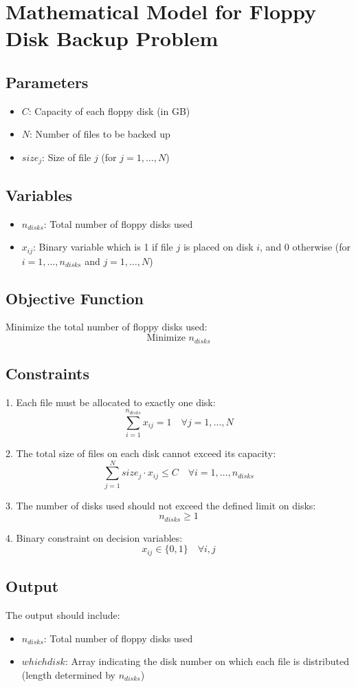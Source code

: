 \documentclass{article}
\begin{document}
\section*{Mathematical Model for Floppy Disk Backup Problem}

\subsection*{Parameters}
\begin{itemize}
    \item $C$: Capacity of each floppy disk (in GB)
    \item $N$: Number of files to be backed up
    \item $size_j$: Size of file $j$ (for $j = 1, \ldots, N$)
\end{itemize}

\subsection*{Variables}
\begin{itemize}
    \item $n_{disks}$: Total number of floppy disks used
    \item $x_{ij}$: Binary variable which is 1 if file $j$ is placed on disk $i$, and 0 otherwise (for $i = 1, \ldots, n_{disks}$ and $j = 1, \ldots, N$)
\end{itemize}

\subsection*{Objective Function}
Minimize the total number of floppy disks used:
\[
\text{Minimize } n_{disks}
\]

\subsection*{Constraints}
1. Each file must be allocated to exactly one disk:
\[
\sum_{i=1}^{n_{disks}} x_{ij} = 1 \quad \forall j = 1, \ldots, N
\]

2. The total size of files on each disk cannot exceed its capacity:
\[
\sum_{j=1}^{N} size_j \cdot x_{ij} \leq C \quad \forall i = 1, \ldots, n_{disks}
\]

3. The number of disks used should not exceed the defined limit on disks:
\[
n_{disks} \geq 1
\]

4. Binary constraint on decision variables:
\[
x_{ij} \in \{0, 1\} \quad \forall i, j
\]

\subsection*{Output}
The output should include:
\begin{itemize}
    \item $n_{disks}$: Total number of floppy disks used
    \item $whichdisk$: Array indicating the disk number on which each file is distributed (length determined by $n_{disks}$)
\end{itemize}
\end{document}
